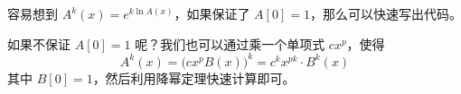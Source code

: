 容易想到 $A^k(x) = e^{k\ln A(x)}$，如果保证了 $A[0] = 1$，那么可以快速写出代码。

如果不保证 $A[0] = 1$ 呢？我们也可以通过乘一个单项式 $cx^p$，使得
\[
A^k(x) = \bigl(cx^p B(x)\bigr)^k = c^k x^{pk} \cdot B^k(x)
\]
其中 $B[0] = 1$，然后利用降幂定理快速计算即可。
